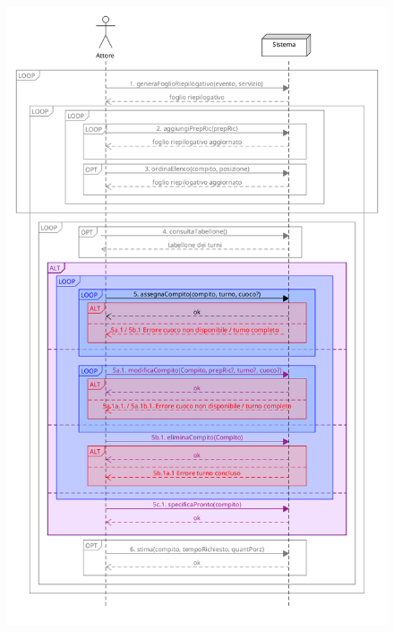 \begin{figure}[h]
  \begin{center}
    \includegraphics[scale = 0.373]{images/SSD/SSD - passo 5.png}
  \end{center}
\end{figure}

\pagebreak
